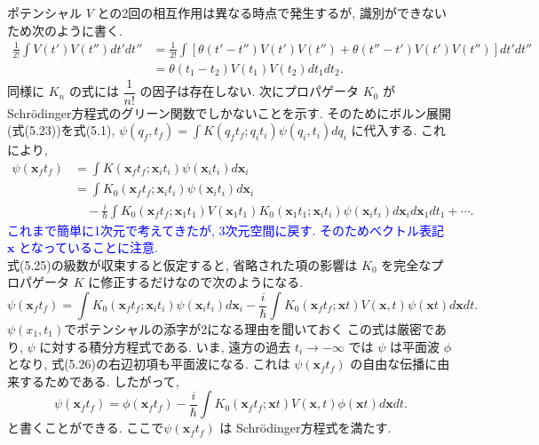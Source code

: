 \documentclass{jsarticle}
\begin{document}
ポテンシャル $V$ との2回の相互作用は異なる時点で発生するが, 識別ができないため次のように書く.
\begin{align*}
    \frac{1}{2!}\int V(t')V(t'') dt' dt'' &= \frac{1}{2!} \int \left[\theta(t' - t'')V(t')V(t'') + \theta(t'' - t')V(t')V(t'')\right]dt'dt''\\
    &= \theta(t_1 - t_2)V(t_1)V(t_2) dt_1 dt_2. \tag{5.24}
\end{align*}
同様に $K_n$ の式には $\dfrac{1}{n!}$ の因子は存在しない. 次にプロパゲータ $K_0$ がSchr\"{o}dinger方程式のグリーン関数でしかないことを示す. そのためにボルン展開(式(5.23))を式(5.1), $\displaystyle \psi(q_f, t_f) = \int K(q_{f}t_{f}; q_{i}t_{i})\psi(q_i, t_i)dq_i$ に代入する. これにより,
\begin{align*}
    \psi(\mathbf{x}_f t_f) &= \int K(\mathbf{x}_f t_f; \mathbf{x}_i t_i)\psi(\mathbf{x}_i t_i)d\mathbf{x}_i\\
    &= \int K_0(\mathbf{x}_f t_f; \mathbf{x}_i t_i)\psi(\mathbf{x}_i t_i)d\mathbf{x}_i\\
    &\quad - \frac{i}{\hbar}\int K_0(\mathbf{x}_f t_f; \mathbf{x}_1 t_1)V(\mathbf{x}_1 t_1)K_0(\mathbf{x}_1 t_1; \mathbf{x}_i t_i)\psi(\mathbf{x}_i t_i)d\mathbf{x}_i d\mathbf{x}_1 dt_1 + \cdots. \tag{5.25}
\end{align*}
\textcolor{blue}{これまで簡単に1次元で考えてきたが, 3次元空間に戻す. そのためベクトル表記 $\mathbf{x}$ となっていることに注意.}\\
式(5.25)の級数が収束すると仮定すると, 省略された項の影響は $K_0$ を完全なプロパゲータ $K$ に修正するだけなので次のようになる.
\begin{equation*}
    \psi(\mathbf{x}_f t_f) = \int K_0(\mathbf{x}_f t_f; \mathbf{x}_i t_i)\psi(\mathbf{x}_i t_i)d\mathbf{x}_i - \frac{i}{\hbar}\int K_0(\mathbf{x}_f t_f; \mathbf{x} t)V(\mathbf{x}, t)\psi(\mathbf{x}t)d\mathbf{x} dt. \tag{5.26}
\end{equation*}
\color{blue}
$\psi(x_1, t_1)$でポテンシャルの添字が2になる理由を聞いておく
\color{black}
この式は厳密であり, $\psi$ に対する積分方程式である. いま, 遠方の過去 $t_i \rightarrow -\infty$ では $\psi$ は平面波 $\phi$ となり, 式(5.26)の右辺初項も平面波になる. これは $\psi(\mathbf{x}_f t_f)$ の自由な伝播に由来するためである. したがって,
\begin{equation*}
    \psi(\mathbf{x}_f t_f) = \phi(\mathbf{x}_f t_f) - \frac{i}{\hbar}\int K_0(\mathbf{x}_f t_f; \mathbf{x} t)V(\mathbf{x}, t) \phi(\mathbf{x} t)d\mathbf{x} dt. \tag{5.27}
\end{equation*}
と書くことができる. ここで$\psi(\mathbf{x}_f t_f)$ は Schr\"{o}dinger方程式を満たす.
\end{document}
